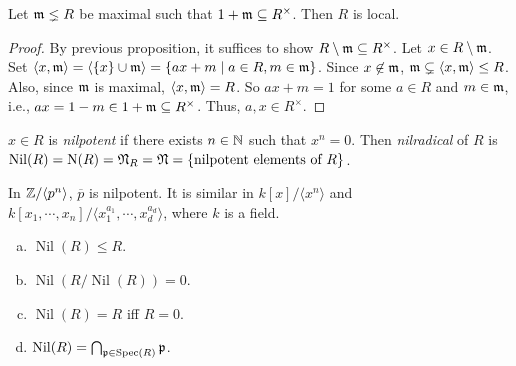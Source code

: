 \begin{proposition}
    Let $\mathfrak{m} \lneq R$ be maximal such that $1 + \mathfrak{m} \subseteq R^\times$. Then $R$ is local.
\end{proposition}

\begin{proof}
    By previous proposition, it suffices to show $R \setminus \mathfrak{m} \subseteq R^\times$. Let $x \in R \setminus \mathfrak{m}$. Set $\langle x, \mathfrak{m} \rangle = \langle \{x\} \cup \mathfrak{m} \rangle = \{ax+m \mid a \in R, m \in \mathfrak{m}\}$. Since $x \not \in \mathfrak{m}$, $\mathfrak{m} \subsetneq \langle x, \mathfrak{m} \rangle \leq R$. Also, since $\mathfrak{m}$ is maximal, $\langle x,\mathfrak{m} \rangle = R$. So $ax + m = 1$ for some $a \in R$ and $m \in \mathfrak{m}$, i.e., $ax = 1-m \in 1 + \mathfrak{m} \subseteq R^\times$. Thus, $a,x \in R^\times$.
\end{proof}

\begin{definition}
    $x \in R$ is \emph{nilpotent} if there exists $n \in \mathbb{N}$ such that $x^n = 0$. Then \emph{nilradical} of $R$ is $\operatorname{Nil}(R) = \operatorname{N}(R) = \mathfrak{N}_R = \mathfrak{N} = \{\text{nilpotent elements of }R\}$.
\end{definition}

\begin{example}
    In $\mathbb{Z}/\langle p^n \rangle$, $\overbar p$ is nilpotent. It is similar in $k[x]/\langle x^n \rangle$ and $k[x_1,\cdots,x_n]/\langle x_1^{a_1},\cdots,x_d^{a_d}\rangle$, where $k$ is a field.
\end{example}

\begin{proposition}
    \begin{enumerate}[(a)]
        \item $\operatorname{Nil}(R) \leq R$.
        \item $\operatorname{Nil}(R/\operatorname{Nil}(R)) = 0$.
        \item $\operatorname{Nil}(R) = R$ iff $R = 0$.
        \item $\operatorname{Nil}(R) = \bigcap_{\mathfrak{p} \in \operatorname{Spec}(R)}\mathfrak{p}$.
    \end{enumerate}
\end{proposition}

